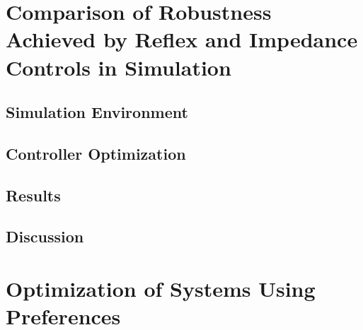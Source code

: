 \section{Comparison of Robustness Achieved by Reflex and Impedance Controls in
    Simulation}\label{sec:completed_comparison}

\subsection{Simulation Environment}\label{sec:sec_simulation_environ}

\subsection{Controller Optimization}\label{sec:completed_comparison_opt}

\subsection{Results}\label{sec:completed_comparison_results}

\subsection{Discussion}\label{sec:completed_comparison_discuss}

\section{Optimization of Systems Using
    Preferences}\label{sec:completed_pref_opt}
